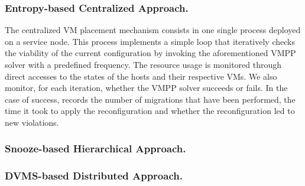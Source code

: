 \subsubsection{Entropy-based Centralized Approach.}
\label{subsec:entropy}

The centralized VM placement mechanism consists in one single \sg
process deployed on a service node. This process implements a simple loop that
iteratively checks the viability of the current configuration by
invoking the aforementioned VMPP solver with a predefined
frequency.
%
The resource usage is monitored through direct accesses
to the states of the hosts and their respective VMs.
%
%
We also monitor, for each iteration, whether the VMPP solver succeeds
or fails. In the case of success, \vmps records the number of migrations
that have been performed, the time it took to apply the
reconfiguration and whether the reconfiguration
led to new violations.

\subsubsection{Snooze-based Hierarchical Approach.}
\label{subsec:snooze}


\subsubsection{DVMS-based Distributed Approach.}
\label{subsec:dvms}



